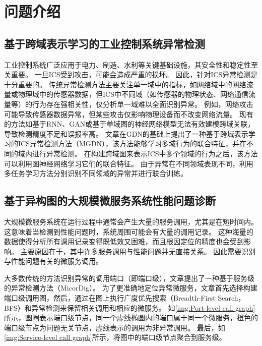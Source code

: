 \section{问题介绍}

\subsection{基于跨域表示学习的工业控制系统异常检测}

工业控制系统广泛应用于电力、制造、水利等关键基础设施，其安全性和稳定性至关重要。
一旦ICS受到攻击，可能会造成严重的损坏。
因此，针对ICS异常检测是十分重要的。
传统异常检测方法主要关注单一域中的指标，如网络域中的网络流量或物理域中的传感器数据，但ICS中不同域（如传感器的物理状态、网络通信流量等）的行为存在强相关性，仅分析单一域难以全面识别异常。
例如，网络攻击可能导致传感器数据异常，但某些攻击仅影响物理设备而不改变网络流量。
现有的方法如基于RNN\cite{mandic2001recurrent}、GAN\cite{creswell2018generative}或基于单域图的神经网络模型无法有效建模跨域关联，导致检测精度不足和误报率高。
文章\cite{zhan2024anomaly}在GDN\cite{deng2021graph}的基础上提出了一种基于跨域表示学习的ICS异常检测方法（MGDN），该方法能够学习多域行为的联合特征，并在不同的域内进行异常检测。
在构建跨域图来表示ICS中多个领域的行为之后，该方法可以利用图神经网络学习它们的联合特征。
由于异常在不同领域表现不同，利用多任务学习方法分别识别不同领域的异常并进行联合训练。

\subsection{基于异构图的大规模微服务系统性能问题诊断}

大规模微服务系统在运行过程中通常会产生大量的服务调用，尤其是在短时间内。
这意味着当检测到性能问题时，系统周围可能会有大量的调用记录。
这种海量的数据使得分析所有调用记录变得既低效又困难，而且根因定位的精度也会受到影响。
主要原因在于，其中许多服务调用与性能问题并无直接关系。
因此需要识别与性能问题有关的微服务调用。

大多数传统的方法识别异常的调用端口（即端口级），文章\cite{tao2024diagnosing}提出了一种基于服务级的异常检测方法（MicorDig）。
为了更准确地定位异常微服务，文章首先选择构建端口级调用图，然后，通过在图上执行广度优先搜索（Breadth-First Search，BFS）和异常检测来保留相关调用和相应的微服务。
如\cref{img:Port-level call graph}所示，圆圈表示端口级节点，同一个虚线椭圆内的端口属于同一个微服务，橙色的端口级节点为问题无关节点，虚线表示的调用为非异常调用。
最后，如\cref{img:Service-level call graph}所示，将图中的端口级节点聚合到服务级。

